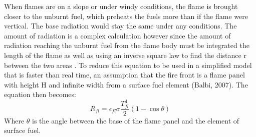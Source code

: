 \documentclass{article}
\begin{document}
When flames are on a slope or under windy conditions, the flame is brought closer to the unburnt fuel, which preheats the fuels more than if the flame were vertical. The base radiation would stay the same under any conditions. The amount of radiation is a complex calculation however since the amount of radiation reaching the unburnt fuel from the flame body must be integrated the length of the flame as well as using an inverse square law to find the distance r between the two areas \citep{Balbi2007}. To reduce this equation to be used in a simplified model that is faster than real time, an assumption that the fire front is a flame panel with height H and infinite width from a surface fuel element (Balbi, 2007). The equation then becomes:
\begin{equation}
	\label{flame_base_2007}
	R_{fl} = \epsilon_{fl} \sigma \frac {T^{4}_{fl}} {2} (1 - \cos \theta)
\end{equation}
Where $\theta $ is the angle between the base of the flame panel and the element of surface fuel. 
\end{document}

